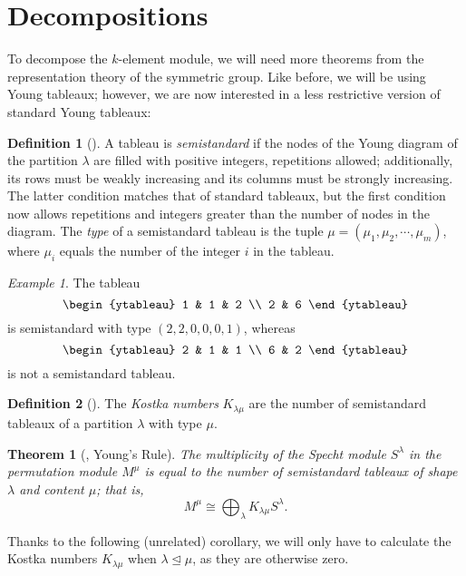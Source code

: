 \documentclass[12pt,twoside]{reedthesis}
\theoremstyle{plain}   %
\newtheorem{thm}{Theorem}[section] %
\theoremstyle{definition}
\newtheorem{defn}{Definition}[section]
\theoremstyle{remark}
\newtheorem{ex}{Example}[section]
\numberwithin{equation}{section}
\def\normeq{\trianglelefteq}
\begin{document}
  \section{Decompositions}
  To decompose the $k$-element module, we will need more theorems from the representation theory of the symmetric group.
  Like before, we will be using Young tableaux; however, we are now interested in a less restrictive version of standard Young tableaux:
  \begin{defn}[{\cite[2.9.1]{sagan}}]
    A tableau is \emph{semistandard} if the nodes of the Young diagram of the partition $\lambda$ are filled with positive integers, repetitions allowed;
    additionally, its rows must be weakly increasing and its columns must be strongly increasing.
    The latter condition matches that of standard tableaux, but the first condition now allows repetitions and integers greater than the number of nodes in the diagram.
    The \emph{type} of a semistandard tableau is the tuple $\mu = (\mu_1, \mu_2, \cdots, \mu_m)$, where $\mu_i$ equals the number of the integer $i$ in the tableau.
  \end{defn}
  \begin{ex}
    The tableau
    \[
      \begin{ytableau}
        1 & 1 & 2 \\
        2 & 6 
      \end{ytableau}
    \]
    is semistandard with type $(2,2,0,0,0,1)$, whereas
    \[
      \begin{ytableau}
        2 & 1 & 1 \\
        6 & 2 
      \end{ytableau}
    \]
    is not a semistandard tableau.
  \end{ex}
  \begin{defn}[{\cite[2.11.1]{sagan}}]
    The \emph{Kostka numbers} $K_{\lambda \mu }$ are the number of semistandard tableaux of a partition $\lambda$ with type $\mu$.
  \end{defn}
  \begin{thm}[{\cite[2.11.2]{sagan}, Young's Rule}]
    The multiplicity of the Specht module $S^\lambda$ in the permutation module $M^\mu$ is equal to the number of semistandard tableaux of shape $\lambda$ and content $\mu$; that is,
    \[ M^\mu \cong \bigoplus_\lambda K_{\lambda \mu} S^\lambda .\]
  \end{thm}
  Thanks to the following (unrelated) corollary, we will only have to calculate the Kostka numbers $K_{\lambda \mu}$ when $\lambda \normeq \mu$, as they are otherwise zero.
\end{document}
